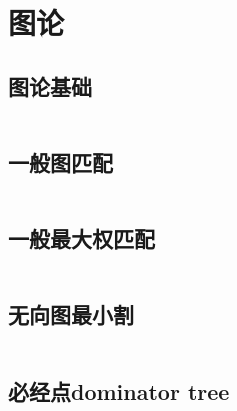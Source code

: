 \chapter{图论}
\section{图论基础}
\inputminted{cpp}{\source/graph-theory/basic.cpp}
\section{一般图匹配}
\inputminted{cpp}{\source/graph-theory/general-matching.cpp}
\section{一般最大权匹配}
\inputminted{cpp}{\source/graph-theory/weighted_blossom.cpp}
\section{无向图最小割}
\inputminted{cpp}{\source/graph-theory/StoerWagner_O(V^3).cpp}
\section{必经点dominator tree}
\inputminted{cpp}{\source/graph-theory/dominator.cpp}